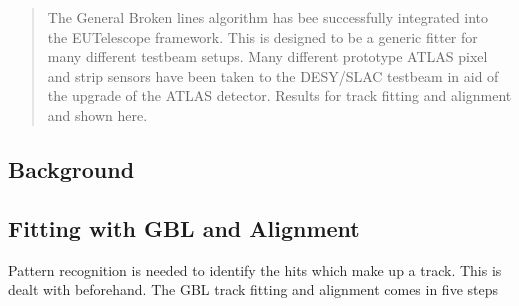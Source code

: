 \documentclass[a0,portrait]{a0poster}
\begin{document}
\vspace{1cm} %


\begin{multicols}{2} %


\begin{tcolorbox}
\color{Navy} %

\begin{abstract}
The General Broken lines algorithm has bee successfully integrated into the EUTelescope framework. This is designed to be a generic fitter for many different testbeam setups. Many different prototype ATLAS pixel and strip sensors have been taken to the DESY/SLAC testbeam in aid of the upgrade of the ATLAS detector. Results for track fitting and alignment and shown here.


\end{abstract}
\end{tcolorbox}




\begin{tcolorbox}
\color{DarkSlateGray} %

\section*{Background}

\subsection*{Fitting with GBL and Alignment}
Pattern recognition is needed to identify the hits which make up a track. This is dealt with beforehand.
The GBL track fitting and alignment comes in five steps


\end{tcolorbox}
\end{multicols}
\end{document}
